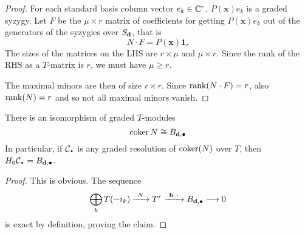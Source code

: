 \documentclass[fleqn,reqno]{amsart}
\numberwithin{first}{chapter}
\begin{document}
\begin{proof}
For each standard basis column vector $e_k\in\mathbb{C}^r$, $P(\mathbf x)e_k$ is a graded syzygy.
Let $F$ be the $\mu\times r$ matrix of coefficients for getting $P(\mathbf x)e_k$
out of the generators of the syzygies over $S_\mathbf d$, that is
\[
	N\cdot F=P(\mathbf x)\mathbf 1_r
\]
The sizes of the matrices on the LHS are $r\times\mu$ and $\mu\times r$.
Since the rank of the RHS as a $T$-matrix is $r$, we must have $\mu\geq r$.

The maximal minors are then of size $r\times r$. Since $\operatorname{rank}(N\cdot F)=r$,
also $\operatorname{rank}(N)=r$ and so not all maximal minors vanish.
\end{proof}

\begin{lemma}
\label{lemma:cokerN}
There is an isomorphism of graded $T$-modules
\[
	\operatorname{coker} N\cong B_{\mathbf d,\bullet}
\]
In particular, if $\mathcal{C}_\nbul$ is any graded resolution of $\operatorname{coker}(N)$ over $T$,
then $H_0\mathcal{C}_\nbul=B_{\d,\bullet}$.
\end{lemma}

\begin{proof}
This is obvious. The sequence
\begin{align}
	\label{eq:exact-seq-coker}
	\bigoplus_k T(-i_k)\xrightarrow{~N~}T^r\xrightarrow{~{\mathbf b}~\cdot~}B_{\mathbf d,\bullet}\longrightarrow 0
\end{align}
is exact by definition, proving the claim.
% 
%
%
%
\end{proof}
\end{document}
